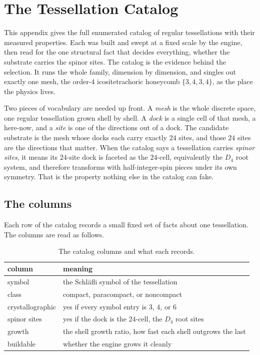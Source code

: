 \section{The Tessellation Catalog}

This appendix gives the full enumerated catalog of regular tessellations with their measured properties. Each was built and swept at a fixed scale by the engine, then read for the one structural fact that decides everything, whether the substrate carries the spinor sites. The catalog is the evidence behind the selection. It runs the whole family, dimension by dimension, and singles out exactly one mesh, the order-4 icositetrachoric honeycomb $\{3,4,3,4\}$, as the place the physics lives.

Two pieces of vocabulary are needed up front. A \emph{mesh} is the whole discrete space, one regular tessellation grown shell by shell. A \emph{dock} is a single cell of that mesh, a here-now, and a \emph{site} is one of the directions out of a dock. The candidate substrate is the mesh whose docks each carry exactly $24$ sites, and those $24$ sites are the directions that matter. When the catalog says a tessellation carries \emph{spinor sites}, it means its $24$-site dock is faceted as the $24$-cell, equivalently the $D_4$ root system, and therefore transforms with half-integer-spin pieces under its own symmetry. That is the property nothing else in the catalog can fake.

\subsection{The columns}

Each row of the catalog records a small fixed set of facts about one tessellation. The columns are read as follows.

\begin{table}[ht]
\centering
\begin{tabular}{@{}ll@{}}
\toprule
column & meaning \\
\midrule
symbol & the Schl\"afli symbol of the tessellation \\
class & compact, paracompact, or noncompact \\
crystallographic & yes if every symbol entry is $3$, $4$, or $6$ \\
spinor sites & yes if the dock is the $24$-cell, the $D_4$ root sites \\
growth & the shell growth ratio, how fast each shell outgrows the last \\
buildable & whether the engine grows it cleanly \\
\bottomrule
\end{tabular}
\caption{The catalog columns and what each records.}
\label{tab:catalog-columns}
\end{table}

